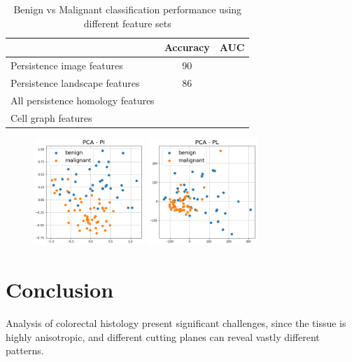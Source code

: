 \documentclass{article}
\begin{document}
\begin{table}[h]
\centering
\begin{tabular}{|l|c|c|}
\hline
 & \textbf{Accuracy} & \textbf{AUC} \\ \hline
Persistence image features & 90 &  \\ \hline
Persistence landscape features & 86 &  \\ \hline
All persistence homology features &  &  \\ \hline
Cell graph features &  &  \\ \hline
\end{tabular}
\caption{Benign vs Malignant classification performance using different feature sets}
\label{tab:cancer_diagnosis_result}
\end{table}


%
\begin{figure}[t]
\centering
\includegraphics[height=1.6in]{figures/pi_PCA.png}
\includegraphics[height=1.6in]{figures/pl_PCA.png}
\end{figure}
%


\section{Conclusion}
\label{sec:conclusion}

Analysis of colorectal histology present significant challenges, since the tissue is highly anisotropic, and different cutting planes can reveal vastly different patterns.



\end{document}

